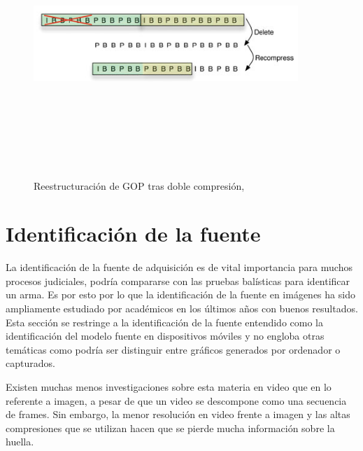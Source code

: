 \begin{figure}[ht!]
\begin{center}
\includegraphics[width=10cm,height=10cm,keepaspectratio]{figuras/doble-compresion.png}
\end{center}
\caption{Reestructuración de GOP tras doble compresión, \cite{bestagini:2012}}
\label{fig_doble-compresion}
\end{figure}

\section{Identificación de la fuente}
La identificación de la fuente de adquisición es de vital importancia para muchos procesos judiciales, podría compararse con las pruebas balísticas para identificar un arma. Es por esto por lo que la identificación de la fuente en imágenes ha sido ampliamente estudiado por académicos en los últimos a\~nos con buenos resultados. 
Esta sección se restringe a la identificación de la fuente entendido como la identificación del modelo fuente en dispositivos móviles y no engloba otras temáticas como podría ser distinguir entre gráficos generados por ordenador o capturados. 

Existen muchas menos investigaciones sobre esta materia en video que en lo referente a imagen, a pesar de que un video se descompone como una secuencia de frames. Sin embargo, la menor resolución en video frente a imagen y las altas compresiones que se utilizan hacen que se pierde mucha información sobre la huella. \\

